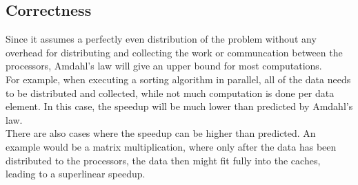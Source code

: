 \subsection{Correctness}
Since it assumes a perfectly even distribution of the problem without any overhead for distributing and collecting the work or communcation between the processors, Amdahl's law will give an upper bound for most computations.\\
For example, when executing a sorting algorithm in parallel, all of the data needs to be distributed and collected, while not much computation is done per data element. In this case, the speedup will be much lower than predicted by Amdahl's law.\\
There are also cases where the speedup can be higher than predicted. An example would be a matrix multiplication, where only after the data has been distributed to the processors, the data then might fit fully into the caches, leading to a superlinear speedup.